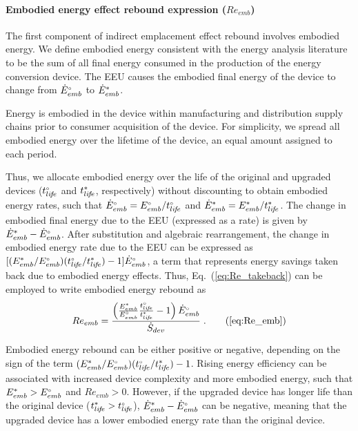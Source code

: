 \paragraph{Embodied energy effect rebound expression ($Re_{emb}$)}
\label{sec:Re_emb}

The first component of indirect emplacement effect rebound
involves embodied energy.
We define embodied energy consistent with the energy analysis literature
to be the sum of all final energy consumed
in the production of the energy conversion device.
The EEU
causes the embodied final energy of the device to change
from ${}{\dot{E}}^{\scriptscriptstyle \circ}_{emb}$ to ${\dot{E}}^*_{emb}$.

Energy is embodied in the device within manufacturing and distribution supply chains
prior to consumer acquisition of the device.
For simplicity, we spread all embodied energy
over the lifetime of the device,
an equal amount assigned to each period.

Thus, we allocate embodied energy over the life of the original and upgraded devices
(${}{t}^{\scriptscriptstyle \circ}_{li\!f\!e}$ and ${t}^*_{li\!f\!e}$, respectively)
without discounting
to obtain embodied energy rates, such that
${}{\dot{E}}^{\scriptscriptstyle \circ}_{emb} = {}{E}^{\scriptscriptstyle \circ}_{emb} / {}{t}^{\scriptscriptstyle \circ}_{li\!f\!e}$
and
${\dot{E}}^*_{emb} = {E}^*_{emb} / {t}^*_{li\!f\!e}$.
The change in embodied final energy due to the EEU (expressed as a rate) is given by
${\dot{E}}^*_{emb} - {}{\dot{E}}^{\scriptscriptstyle \circ}_{emb}$.
After substitution and algebraic rearrangement,
the change in embodied energy rate due to the EEU can be expressed as
$[ ({E}^*_{emb}/{}{E}^{\scriptscriptstyle \circ}_{emb})({}{t}^{\scriptscriptstyle \circ}_{li\!f\!e}/{t}^*_{li\!f\!e}) - 1 ] {}{\dot{E}}^{\scriptscriptstyle \circ}_{emb}$,
a term that represents energy savings taken back due to embodied energy effects.
Thus, Eq.~(\ref{eq:Re_takeback}) can be employed to write embodied energy rebound as
%
\begin{equation}
  Re_{emb} = \Reembeqn{} \; . \tag{\ref{eq:Re_emb}}
\end{equation}

Embodied energy rebound can be either positive or negative, depending on
the sign of the term
$({E}^*_{emb}/{}{E}^{\scriptscriptstyle \circ}_{emb})({}{t}^{\scriptscriptstyle \circ}_{li\!f\!e}/{t}^*_{li\!f\!e}) - 1$.
Rising energy efficiency can be associated with increased device complexity
and more embodied energy,
such that ${E}^*_{emb} > {}{E}^{\scriptscriptstyle \circ}_{emb}$ and $Re_{emb} > 0$.
However, if the upgraded device has longer life than the original device
(${t}^*_{li\!f\!e} > {}{t}^{\scriptscriptstyle \circ}_{li\!f\!e}$),
${\dot{E}}^*_{emb} - {}{\dot{E}}^{\scriptscriptstyle \circ}_{emb}$ can be negative,
meaning that the upgraded device has a lower embodied energy rate than the original device.


